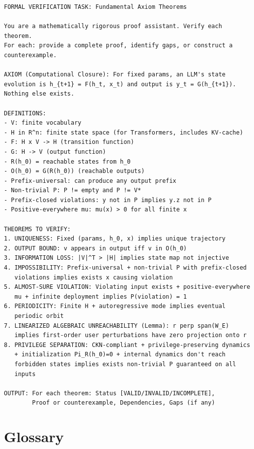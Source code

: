 \documentclass[11pt]{article}
\theoremstyle{definition}
\theoremstyle{remark}
\begin{document}
\begin{Verbatim}[fontsize=\small, frame=single, framesep=2mm]
FORMAL VERIFICATION TASK: Fundamental Axiom Theorems

You are a mathematically rigorous proof assistant. Verify each theorem.
For each: provide a complete proof, identify gaps, or construct a 
counterexample.

AXIOM (Computational Closure): For fixed params, an LLM's state 
evolution is h_{t+1} = F(h_t, x_t) and output is y_t = G(h_{t+1}). 
Nothing else exists.

DEFINITIONS:
- V: finite vocabulary
- H in R^n: finite state space (for Transformers, includes KV-cache)
- F: H x V -> H (transition function)
- G: H -> V (output function)
- R(h_0) = reachable states from h_0
- O(h_0) = G(R(h_0)) (reachable outputs)
- Prefix-universal: can produce any output prefix
- Non-trivial P: P != empty and P != V*
- Prefix-closed violations: y not in P implies y.z not in P
- Positive-everywhere mu: mu(x) > 0 for all finite x

THEOREMS TO VERIFY:
1. UNIQUENESS: Fixed (params, h_0, x) implies unique trajectory
2. OUTPUT BOUND: v appears in output iff v in O(h_0)
3. INFORMATION LOSS: |V|^T > |H| implies state map not injective
4. IMPOSSIBILITY: Prefix-universal + non-trivial P with prefix-closed
   violations implies exists x causing violation
5. ALMOST-SURE VIOLATION: Violating input exists + positive-everywhere 
   mu + infinite deployment implies P(violation) = 1
6. PERIODICITY: Finite H + autoregressive mode implies eventual 
   periodic orbit
7. LINEARIZED ALGEBRAIC UNREACHABILITY (Lemma): r perp span(W_E) 
   implies first-order user perturbations have zero projection onto r
8. PRIVILEGE SEPARATION: CKN-compliant + privilege-preserving dynamics
   + initialization Pi_R(h_0)=0 + internal dynamics don't reach 
   forbidden states implies exists non-trivial P guaranteed on all 
   inputs

OUTPUT: For each theorem: Status [VALID/INVALID/INCOMPLETE], 
        Proof or counterexample, Dependencies, Gaps (if any)
\end{Verbatim}

\section{Glossary}
\end{document}
